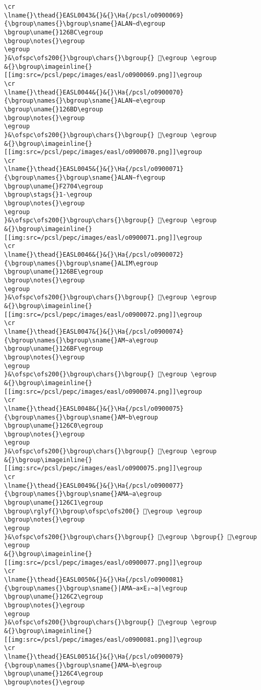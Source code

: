 \begin{verbatim}
\cr
\lname{}\thead{}EASL0043&{}&{}\Ha{/pcsl/o0900069}{\bgroup\names{}\bgroup\sname{}ALAN∼d\egroup
\bgroup\uname{}126BC\egroup
\bgroup\notes{}\egroup
\egroup
}&\ofspc\ofs200{}\bgroup\chars{}\bgroup{} 𒚼\egroup \egroup
&{}\bgroup\imageinline{}[[img:src=/pcsl/pepc/images/easl/o0900069.png]]\egroup
\cr
\lname{}\thead{}EASL0044&{}&{}\Ha{/pcsl/o0900070}{\bgroup\names{}\bgroup\sname{}ALAN∼e\egroup
\bgroup\uname{}126BD\egroup
\bgroup\notes{}\egroup
\egroup
}&\ofspc\ofs200{}\bgroup\chars{}\bgroup{} 𒚽\egroup \egroup
&{}\bgroup\imageinline{}[[img:src=/pcsl/pepc/images/easl/o0900070.png]]\egroup
\cr
\lname{}\thead{}EASL0045&{}&{}\Ha{/pcsl/o0900071}{\bgroup\names{}\bgroup\sname{}ALAN∼f\egroup
\bgroup\uname{}F2704\egroup
\bgroup\stags{}1-\egroup
\bgroup\notes{}\egroup
\egroup
}&\ofspc\ofs200{}\bgroup\chars{}\bgroup{} 󲜄\egroup \egroup
&{}\bgroup\imageinline{}[[img:src=/pcsl/pepc/images/easl/o0900071.png]]\egroup
\cr
\lname{}\thead{}EASL0046&{}&{}\Ha{/pcsl/o0900072}{\bgroup\names{}\bgroup\sname{}ALIM\egroup
\bgroup\uname{}126BE\egroup
\bgroup\notes{}\egroup
\egroup
}&\ofspc\ofs200{}\bgroup\chars{}\bgroup{} 𒚾\egroup \egroup
&{}\bgroup\imageinline{}[[img:src=/pcsl/pepc/images/easl/o0900072.png]]\egroup
\cr
\lname{}\thead{}EASL0047&{}&{}\Ha{/pcsl/o0900074}{\bgroup\names{}\bgroup\sname{}AM∼a\egroup
\bgroup\uname{}126BF\egroup
\bgroup\notes{}\egroup
\egroup
}&\ofspc\ofs200{}\bgroup\chars{}\bgroup{} 𒚿\egroup \egroup
&{}\bgroup\imageinline{}[[img:src=/pcsl/pepc/images/easl/o0900074.png]]\egroup
\cr
\lname{}\thead{}EASL0048&{}&{}\Ha{/pcsl/o0900075}{\bgroup\names{}\bgroup\sname{}AM∼b\egroup
\bgroup\uname{}126C0\egroup
\bgroup\notes{}\egroup
\egroup
}&\ofspc\ofs200{}\bgroup\chars{}\bgroup{} 𒛀\egroup \egroup
&{}\bgroup\imageinline{}[[img:src=/pcsl/pepc/images/easl/o0900075.png]]\egroup
\cr
\lname{}\thead{}EASL0049&{}&{}\Ha{/pcsl/o0900077}{\bgroup\names{}\bgroup\sname{}AMA∼a\egroup
\bgroup\uname{}126C1\egroup
\bgroup\rglyf{}\bgroup\ofspc\ofs200{} 𒛁\egroup \egroup
\bgroup\notes{}\egroup
\egroup
}&\ofspc\ofs200{}\bgroup\chars{}\bgroup{} 𒛁\egroup \bgroup{} 𒛃\egroup \egroup
&{}\bgroup\imageinline{}[[img:src=/pcsl/pepc/images/easl/o0900077.png]]\egroup
\cr
\lname{}\thead{}EASL0050&{}&{}\Ha{/pcsl/o0900081}{\bgroup\names{}\bgroup\sname{}|AMA∼a×E₂∼a|\egroup
\bgroup\uname{}126C2\egroup
\bgroup\notes{}\egroup
\egroup
}&\ofspc\ofs200{}\bgroup\chars{}\bgroup{} 𒛂\egroup \egroup
&{}\bgroup\imageinline{}[[img:src=/pcsl/pepc/images/easl/o0900081.png]]\egroup
\cr
\lname{}\thead{}EASL0051&{}&{}\Ha{/pcsl/o0900079}{\bgroup\names{}\bgroup\sname{}AMA∼b\egroup
\bgroup\uname{}126C4\egroup
\bgroup\notes{}\egroup

\end{verbatim}
